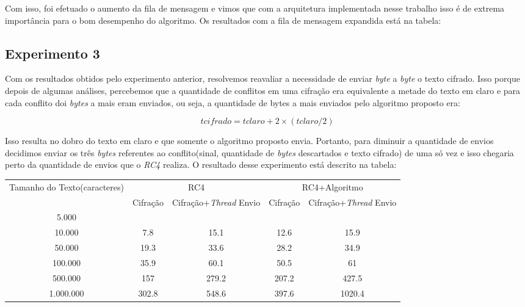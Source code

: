 Com isso, foi efetuado o aumento da fila de mensagem e vimos que com a arquitetura implementada nesse trabalho isso é de extrema importância para o bom desempenho do algoritmo. Os resultados com a fila de mensagem expandida está na tabela:


\subsection{Experimento 3}

Com os resultados obtidos pelo experimento anterior, resolvemos reavaliar a necessidade de enviar \textit{byte} a \textit{byte} o texto cifrado. Isso porque depois de algumas análises, percebemos que a quantidade de conflitos em uma cifração era equivalente a metade do texto em claro e para cada conflito doi \textit{bytes} a mais eram enviados, ou seja, a quantidade de bytes a mais enviados pelo algoritmo proposto era:

\begin{equation}
	tcifrado = tclaro + 2 \times (tclaro/2)
\end{equation}

Isso resulta no dobro do texto em claro e que somente o algoritmo proposto envia. Portanto, para diminuir a quantidade de envios decidimos enviar os três \textit{bytes} referentes ao conflito(sinal, quantidade de \textit{bytes} descartados e texto cifrado) de uma só vez e isso chegaria perto da quantidade de envios que o \textit{RC4} realiza. O resultado desse experimento está descrito na tabela:

\begin{table}[h]
\begin{tabular}{|c|c|c|c|c|}
\hline
\multirow{2}{*}{Tamanho do Texto(caracteres)} & \multicolumn{2}{c|}{RC4}         & \multicolumn{2}{c|}{RC4+Algoritmo} \\ \cline{2-5} 
                                              & Cifração & Cifração+\textit{Thread} Envio & Cifração  & Cifração+\textit{Thread} Envio  \\ \hline
5.000                                         &          &                       &           &                        \\ \hline
10.000                                        & 7.8      & 15.1                  & 12.6      & 15.9                   \\ \hline
50.000                                        & 19.3     & 33.6                  & 28.2      & 34.9                   \\ \hline
100.000                                       & 35.9     & 60.1                  & 50.5      & 61                     \\ \hline
500.000                                       & 157      & 279.2                 & 207.2     & 427.5                  \\ \hline
1.000.000                                     & 302.8    & 548.6                 & 397.6     & 1020.4                 \\ \hline
\end{tabular}
\end{table}

